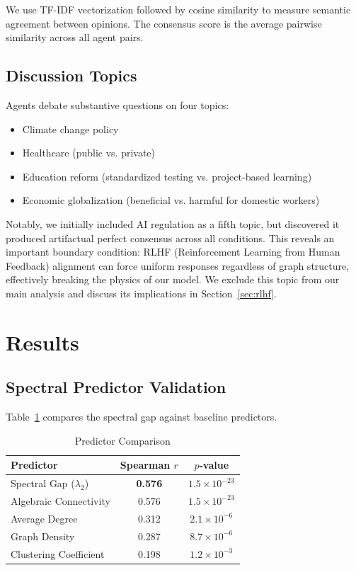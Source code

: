 \documentclass[10pt]{article}
\begin{document}
We use TF-IDF vectorization followed by cosine similarity to measure semantic agreement between opinions. The consensus score is the average pairwise similarity across all agent pairs.

\subsection{Discussion Topics}

Agents debate substantive questions on four topics:
\begin{itemize}
    \item Climate change policy
    \item Healthcare (public vs. private)
    \item Education reform (standardized testing vs. project-based learning)
    \item Economic globalization (beneficial vs. harmful for domestic workers)
\end{itemize}

Notably, we initially included AI regulation as a fifth topic, but discovered it produced artifactual perfect consensus across all conditions. This reveals an important boundary condition: RLHF (Reinforcement Learning from Human Feedback) alignment can force uniform responses regardless of graph structure, effectively breaking the physics of our model. We exclude this topic from our main analysis and discuss its implications in Section~\ref{sec:rlhf}.

\section{Results}

\subsection{Spectral Predictor Validation}

Table~\ref{tab:predictors} compares the spectral gap against baseline predictors.

\begin{table}[h]
\centering
\caption{Predictor Comparison}
\label{tab:predictors}
\begin{tabular}{lcc}
\toprule
Predictor & Spearman $r$ & $p$-value \\
\midrule
Spectral Gap ($\lambda_2$) & \textbf{0.576} & \textbf{$1.5 \times 10^{-23}$} \\
Algebraic Connectivity & 0.576 & $1.5 \times 10^{-23}$ \\
Average Degree & 0.312 & $2.1 \times 10^{-6}$ \\
Graph Density & 0.287 & $8.7 \times 10^{-6}$ \\
Clustering Coefficient & 0.198 & $1.2 \times 10^{-3}$ \\
\bottomrule
\end{tabular}
\end{table}
\end{document}
